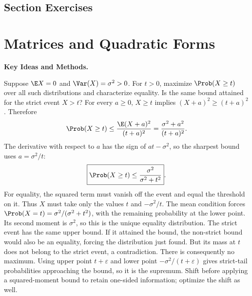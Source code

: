 

\par{}
\subsection*{Section Exercises}


\section{Matrices and Quadratic Forms}
\noindent\textbf{Key Ideas and Methods.}\enspace





Suppose $\E X=0$ and $\Var(X)=\sigma^2>0$. For $t>0$, maximize $\Prob(X\ge t)$ over all such distributions and characterize equality. Is the same bound attained for the strict event $X>t$?
\solution For every $a\ge0$, $X\ge t$ implies $(X+a)^2\ge(t+a)^2$. Therefore
\[
 \Prob(X\ge t)\le\frac{\E(X+a)^2}{(t+a)^2}
 =\frac{\sigma^2+a^2}{(t+a)^2}.
\]
The derivative with respect to $a$ has the sign of $at-\sigma^2$, so the sharpest bound uses $a=\sigma^2/t$:
\[
 \boxed{\Prob(X\ge t)\le\frac{\sigma^2}{\sigma^2+t^2}}.
\]
For equality, the squared term must vanish off the event and equal the threshold on it. Thus $X$ must take only the values $t$ and $-\sigma^2/t$. The mean condition forces $\Prob(X=t)=\sigma^2/(\sigma^2+t^2)$, with the remaining probability at the lower point. Its second moment is $\sigma^2$, so this is the unique equality distribution.
The strict event has the same upper bound. If it attained the bound, the non-strict bound would also be an equality, forcing the distribution just found. But its mass at $t$ does not belong to the strict event, a contradiction. There is consequently no maximum. Using upper point $t+\varepsilon$ and lower point $-\sigma^2/(t+\varepsilon)$ gives strict-tail probabilities approaching the bound, so it is the supremum.
\insight Shift before applying a squared-moment bound to retain one-sided information; optimize the shift as well.

